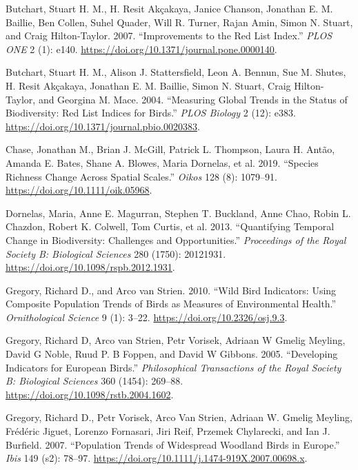 \documentclass[
  12pt,
  oneside]{report}
\begin{document}
\leavevmode\hypertarget{ref-butchart_improvements_2007}{}%
Butchart, Stuart H. M., H. Resit Akçakaya, Janice Chanson, Jonathan E. M. Baillie, Ben Collen, Suhel Quader, Will R. Turner, Rajan Amin, Simon N. Stuart, and Craig Hilton-Taylor. 2007. ``Improvements to the Red List Index.'' \emph{PLOS ONE} 2 (1): e140. \url{https://doi.org/10.1371/journal.pone.0000140}.

\leavevmode\hypertarget{ref-butchart_measuring_2004}{}%
Butchart, Stuart H. M., Alison J. Stattersfield, Leon A. Bennun, Sue M. Shutes, H. Resit Akçakaya, Jonathan E. M. Baillie, Simon N. Stuart, Craig Hilton-Taylor, and Georgina M. Mace. 2004. ``Measuring Global Trends in the Status of Biodiversity: Red List Indices for Birds.'' \emph{PLOS Biology} 2 (12): e383. \url{https://doi.org/10.1371/journal.pbio.0020383}.

\leavevmode\hypertarget{ref-chase_species_2019}{}%
Chase, Jonathan M., Brian J. McGill, Patrick L. Thompson, Laura H. Antão, Amanda E. Bates, Shane A. Blowes, Maria Dornelas, et al. 2019. ``Species Richness Change Across Spatial Scales.'' \emph{Oikos} 128 (8): 1079--91. \url{https://doi.org/10.1111/oik.05968}.

\leavevmode\hypertarget{ref-dornelas_quantifying_2013}{}%
Dornelas, Maria, Anne E. Magurran, Stephen T. Buckland, Anne Chao, Robin L. Chazdon, Robert K. Colwell, Tom Curtis, et al. 2013. ``Quantifying Temporal Change in Biodiversity: Challenges and Opportunities.'' \emph{Proceedings of the Royal Society B: Biological Sciences} 280 (1750): 20121931. \url{https://doi.org/10.1098/rspb.2012.1931}.

\leavevmode\hypertarget{ref-gregory_wild_2010}{}%
Gregory, Richard D., and Arco van Strien. 2010. ``Wild Bird Indicators: Using Composite Population Trends of Birds as Measures of Environmental Health.'' \emph{Ornithological Science} 9 (1): 3--22. \url{https://doi.org/10.2326/osj.9.3}.

\leavevmode\hypertarget{ref-gregory_developing_2005}{}%
Gregory, Richard D, Arco van Strien, Petr Vorisek, Adriaan W Gmelig Meyling, David G Noble, Ruud P. B Foppen, and David W Gibbons. 2005. ``Developing Indicators for European Birds.'' \emph{Philosophical Transactions of the Royal Society B: Biological Sciences} 360 (1454): 269--88. \url{https://doi.org/10.1098/rstb.2004.1602}.

\leavevmode\hypertarget{ref-gregory_population_2007}{}%
Gregory, Richard D., Petr Vorisek, Arco Van Strien, Adriaan W. Gmelig Meyling, Frédéric Jiguet, Lorenzo Fornasari, Jiri Reif, Przemek Chylarecki, and Ian J. Burfield. 2007. ``Population Trends of Widespread Woodland Birds in Europe.'' \emph{Ibis} 149 (s2): 78--97. \url{https://doi.org/10.1111/j.1474-919X.2007.00698.x}.
\end{document}
